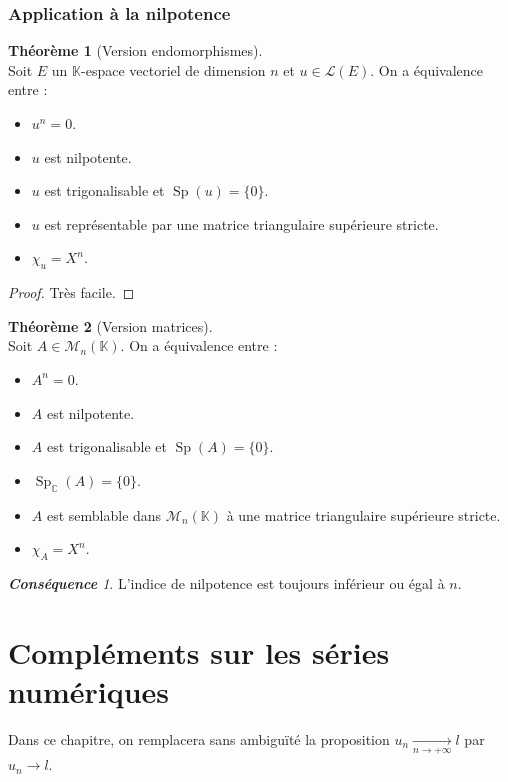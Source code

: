 \documentclass[12pt]{book}
\let\ensembleNombre\mathbb
\newcommand*\C{\ensuremath{\ensembleNombre{C}}}
\newcommand*\K{\ensuremath{\ensembleNombre{K}}}
\newcommand{\limite}[2]{\ensuremath{\underset{#1 \to #2}{\longrightarrow}}}
\DeclareMathOperator{\Sp}{Sp}
\theoremstyle{definition}
\newtheorem{thme}{Théorème}[chapter]
\theoremstyle{remark}
\newtheorem*{cons}{\textbf{Conséquence}}
\newenvironment{fthme}
  {\begin{mdframed}[roundcorner=10pt, linewidth=2pt]\begin{thme}}
  {\end{thme}\end{mdframed}}
\begin{document}
	\subsection{Application à la nilpotence}
	\begin{fthme}[Version endomorphismes] \mbox{~}\\
	Soit $E$ un $\K$-espace vectoriel de dimension $n$ et $u \in \mathcal L(E)$. On a équivalence entre :
	\begin{itemize}
	\item[1)] $u^n = 0$.
	\item[2)] $u$ est nilpotente.
	\item[3)] $u$ est trigonalisable et $\Sp(u) = \lbrace 0 \rbrace$.
	\item[4)] $u$ est représentable par une matrice triangulaire supérieure stricte.
	\item[5)] $\chi_u = X^n$.
	\end{itemize}
	\end{fthme}
	\begin{proof}
	Très facile.
	\end{proof}
	
	\begin{fthme}[Version matrices] \mbox{~}\\
	Soit $A \in \mathcal M_n(\K)$. On a équivalence entre :
	\begin{itemize}
	\item[1)] $A^n = 0$.
	\item[2)] $A$ est nilpotente.
	\item[3)] $A$ est trigonalisable et $\Sp(A) = \lbrace 0 \rbrace$.
	\item[3')] $\Sp_\C(A) = \lbrace 0 \rbrace$.
	\item[4)] $A$ est semblable dans $\mathcal M_n(\K)$ à une matrice triangulaire supérieure stricte.
	\item[5)] $\chi_A = X^n$.
	\end{itemize}
	\end{fthme}
	
	\begin{cons}
	L'indice de nilpotence est toujours inférieur ou égal à $n$.
	\end{cons}
	
\chapter{Compléments sur les séries numériques}
	Dans ce chapitre, on remplacera sans ambigu\"{i}té la proposition $u_n \limite{n}{+\infty} l$ par $u_n \longrightarrow l$.
\end{document}
